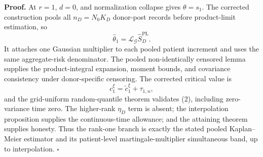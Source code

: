 \textbf{Proof.}
At \(r=1\), \(d=0\), and normalization collapse gives \(\theta=s_1\). The corrected construction pools all \(n_D=N_0K_D\) donor-post records before product-limit estimation, so
\[
 \widehat\theta_1=\mathcal L_{\mathcal G}\widehat S_D^{\mathrm{PL}}. \tag{1}
\]
It attaches one Gaussian multiplier to each pooled patient increment and uses the same aggregate-risk denominator. The pooled non-identically censored lemma supplies the product-integral expansion, moment bounds, and covariance consistency under donor-specific censoring. The corrected critical value is
\[
 c_1^\xi=\widetilde c_1^\xi+\tau_{1,n},                  \tag{2}
\]
and the grid-uniform random-quantile theorem validates (2), including zero-variance time zero. The higher-rank \(\eta_D\) term is absent; the interpolation proposition supplies the continuous-time allowance; and the attaining theorem supplies honesty. Thus the rank-one branch is exactly the stated pooled Kaplan--Meier estimator and its patient-level martingale-multiplier simultaneous band, up to interpolation. \(\square\)